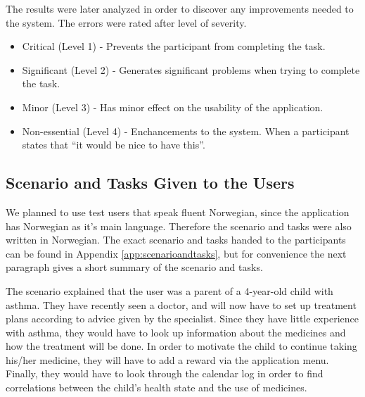 The results were later analyzed in order to discover any improvements needed to the system. The errors were rated after level of severity\cite{dumas1995practical}. 

\begin{itemize}
\item{Critical (Level 1) - Prevents the participant from completing the task.}
\item{Significant (Level 2) - Generates significant problems when trying to complete the task.}
\item{Minor (Level 3) - Has minor effect on the usability of the application.}
\item{Non-essential (Level 4) - Enchancements to the system. When a participant states that ``it would be nice to have this''.}
\end{itemize}



\subsection{Scenario and Tasks Given to the Users}
\label{sec:scenarioandtasksgiventotheusers}
We planned to use test users that speak fluent Norwegian, since the application has Norwegian as it's main language. Therefore the scenario and tasks were also written in Norwegian. The exact scenario and tasks handed to the participants can be found in Appendix \ref{app:scenarioandtasks}, but for convenience the next paragraph gives a short summary of the scenario and tasks.

The scenario explained that the user was a parent of a 4-year-old child with asthma. They have recently seen a doctor, and will now have to set up treatment plans according to advice given by the specialist. Since they have little experience with asthma, they would have to look up information about the medicines and how the treatment will be done. In order to motivate the child to continue taking his/her medicine, they will have to add a reward via the application menu. Finally, they would have to look through the calendar log in order to find correlations between the child's health state and the use of medicines. 
